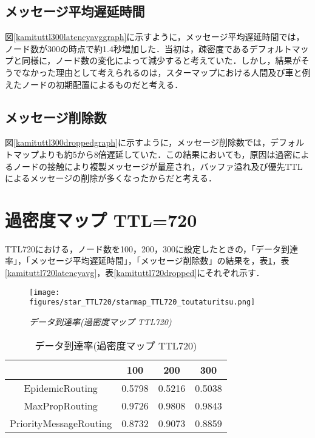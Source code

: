 \documentclass[11pt]{icsthesis}
\begin{document}
\subsection{メッセージ平均遅延時間}
図\ref{kamituttl300latencyavggraph}に示すように，メッセージ平均遅延時間では，ノード数が300の時点で約1.4秒増加した．当初は，疎密度であるデフォルトマップと同様に，ノード数の変化によって減少すると考えていた．しかし，結果がそうでなかった理由として考えられるのは，スターマップにおける人間及び車と例えたノードの初期配置によるものだと考える．

\subsection{メッセージ削除数}
図\ref{kamituttl300droppedgraph}に示すように，メッセージ削除数では，デフォルトマップよりも約5から8倍遅延していた．この結果においても，原因は過密によるノードの接触により複製メッセージが量産され，バッファ溢れ及び優先TTLによるメッセージの削除が多くなったからだと考える．

\newpage

\section{過密度マップ TTL=720}
TTL720における，ノード数を100，200，300に設定したときの，「データ到達率」，「メッセージ平均遅延時間」，「メッセージ削除数」の結果を，表\ref{kamituttl720deliveryprob}，表\ref{kamituttl720latencyavg}，表\ref{kamituttl720dropped}にそれぞれ示す．

\begin{figure}[h]
\centering
\texttt{[image: figures/star\_TTL720/starmap\_TTL720\_toutaturitsu.png]}
\caption[]{\it{データ到達率(過密度マップ TTL720)}}
\label{kamituttl720deliveryprobgraph}
\end{figure}

\begin{table}[H]
 \begin{center}
      \caption[]{データ到達率(過密度マップ TTL720)}
      \label{kamituttl720deliveryprob}
      \begin{tabular}{|c|c|c|c|}
\hline
&100&200&300\\
\hline
EpidemicRouting&0.5798&0.5216&0.5038\\
\hline
MaxPropRouting&0.9726&0.9808&0.9843\\
\hline
PriorityMessageRouting&0.8732&0.9073&0.8859\\
\hline
      \end{tabular}
    \end{center}
\end{table}
\end{document}
